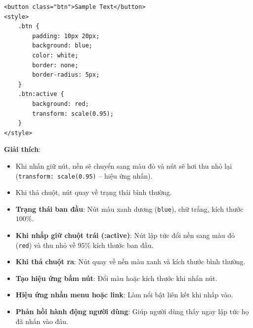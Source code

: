 \documentclass[11pt,oneside]{book}
\newcommand{\codeinline}[1]{\textcolor{accentOrange}{\texttt{#1}}}
\begin{document}
\begin{conceptBox}
\begin{codeWindow}
\begin{lstlisting}[language=HTML5]
<button class="btn">Sample Text</button>
<style>
    .btn {
        padding: 10px 20px;
        background: blue;
        color: white;
        border: none;
        border-radius: 5px;
    }
    .btn:active {
        background: red;
        transform: scale(0.95);
    }
</style>
\end{lstlisting}
\end{codeWindow}
\textbf{Giải thích}:
\begin{itemize}[leftmargin=1.5em, itemsep=2pt, parsep=0pt]
    \item Khi nhấn giữ nút, nền sẽ chuyển sang màu đỏ và nút sẽ hơi thu nhỏ lại (\codeinline{transform: scale(0.95)} -- hiệu ứng nhấn).
    \item Khi thả chuột, nút quay về trạng thái bình thường.
\end{itemize}
\end{conceptBox}

\begin{browserWindow}
\begin{itemize}[leftmargin=1.5em, itemsep=3pt, parsep=0pt]
    \item \textbf{Trạng thái ban đầu}: Nút màu xanh dương (\codeinline{blue}), chữ trắng, kích thước $100\%$.
    \item \textbf{Khi nhấp giữ chuột trái (:active)}: Nút lập tức đổi nền sang màu đỏ (\codeinline{red}) và thu nhỏ về $95\%$ kích thước ban đầu.
    \item \textbf{Khi thả chuột ra}: Nút quay về nền màu xanh và kích thước bình thường.
\end{itemize}
\end{browserWindow}

\begin{tipBox}
\begin{itemize}[leftmargin=1.5em, itemsep=3pt, parsep=0pt]
    \item \textbf{Tạo hiệu ứng bấm nút}: Đổi màu hoặc kích thước khi nhấn nút.
    \item \textbf{Hiệu ứng nhấn menu hoặc link}: Làm nổi bật liên kết khi nhấp vào.
    \item \textbf{Phản hồi hành động người dùng}: Giúp người dùng thấy ngay lập tức họ đã nhấn vào đâu.
\end{itemize}
\end{tipBox}
\end{document}
